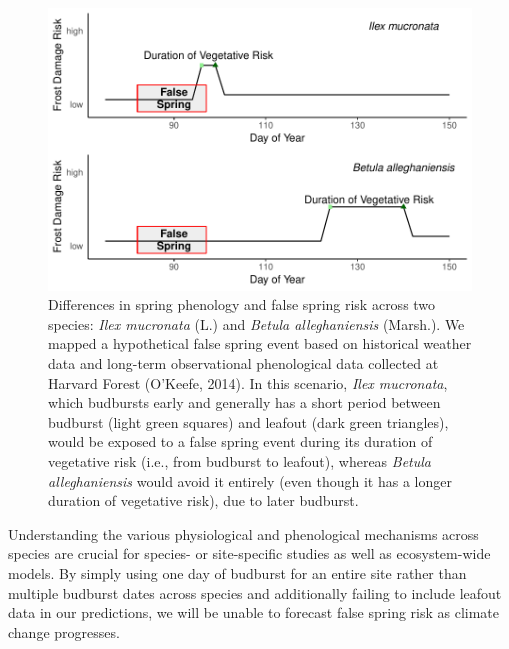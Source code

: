 \documentclass{article}\usepackage[]{graphicx}\usepackage[]{color}
\makeatletter
\def\maxwidth{ %
  \ifdim\Gin@nat@width>\linewidth
    \linewidth
  \else
    \Gin@nat@width
  \fi
}
\makeatother
\begin{document}
\begin{figure}[H]

{\centering \includegraphics[width=\maxwidth]{figure/risk-1} 

}

\caption{Differences in spring phenology and false spring risk across two species: \textit{Ilex mucronata} (L.) and \textit{Betula alleghaniensis} (Marsh.). We mapped a hypothetical false spring event based on historical weather data and long-term observational phenological data collected at Harvard Forest (O'Keefe, 2014). In this scenario, \textit{Ilex mucronata}, which budbursts early and generally has a short period between budburst (light green squares) and leafout (dark green triangles), would be exposed to a false spring event during its duration of vegetative risk (i.e., from budburst to leafout), whereas \textit{Betula alleghaniensis} would avoid it entirely (even though it has a longer duration of vegetative risk), due to later budburst.}\label{fig:risk}
\end{figure}



Understanding the various physiological and phenological mechanisms across species are crucial for species- or site-specific studies as well as ecosystem-wide models. By simply using one day of budburst for an entire site rather than multiple budburst dates across species and additionally failing to include leafout data in our predictions, we will be unable to forecast false spring risk as climate change progresses. 
\end{document}
